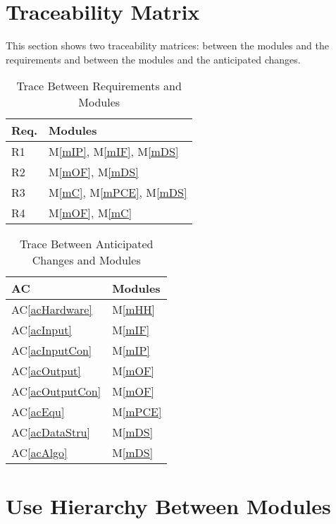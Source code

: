 \documentclass[12pt, titlepage]{article}
\newcommand{\acref}[1]{AC\ref{#1}}
\newcommand{\mref}[1]{M\ref{#1}}
\begin{document}
\begin{description}
\section{Traceability Matrix} \label{SecTM}

This section shows two traceability matrices: between the modules and the
requirements and between the modules and the anticipated changes.

\begin{table}[H]
\centering
\begin{tabular}{p{} p{}}
\toprule
\textbf{Req.} & \textbf{Modules}\\
\midrule
R1 & \mref{mIP}, \mref{mIF}, \mref{mDS}\\
R2 & \mref{mOF}, \mref{mDS}\\
R3 & \mref{mC}, \mref{mPCE}, \mref{mDS}\\
R4 & \mref{mOF}, \mref{mC}\\

\bottomrule
\end{tabular}
\caption{Trace Between Requirements and Modules}
\label{TblRT}
\end{table}

\begin{table}[H]
\centering
\begin{tabular}{p{} p{}}
\toprule
\textbf{AC} & \textbf{Modules}\\
\midrule
\acref{acHardware} & \mref{mHH}\\
\acref{acInput} & \mref{mIF}\\
\acref{acInputCon} & \mref{mIP}\\
\acref{acOutput} & \mref{mOF}\\
\acref{acOutputCon} & \mref{mOF}\\
\acref{acEqu} & \mref{mPCE}\\
\acref{acDataStru} & \mref{mDS}\\
\acref{acAlgo} & \mref{mDS}\\

\bottomrule
\end{tabular}
\caption{Trace Between Anticipated Changes and Modules}
\label{TblACT}
\end{table}

\section{Use Hierarchy Between Modules} \label{SecUse}


\end{description}
\end{document}
